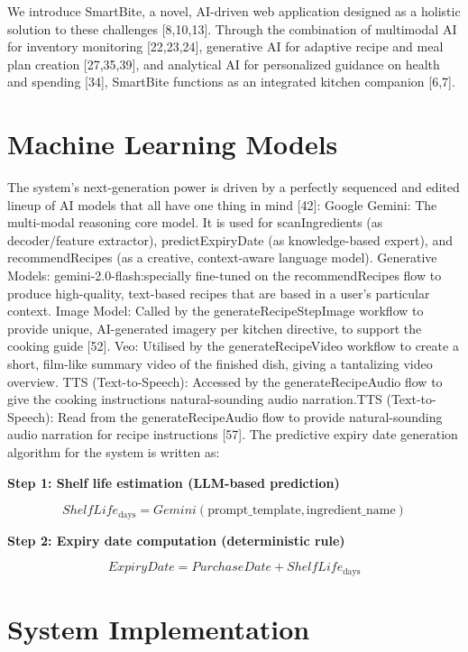 \documentclass[conference]{IEEEtran}
\newcommand{\bluecite}[1]{\textcolor{citation-blue}{[#1]}}
\begin{document}
We introduce SmartBite, a novel, AI-driven web application designed as a holistic solution to these challenges \bluecite{8,10,13}. Through the combination of multimodal AI for inventory monitoring \bluecite{22,23,24}, generative AI for adaptive recipe and meal plan creation \bluecite{27,35,39}, and analytical AI for personalized guidance on health and spending \bluecite{34}, SmartBite functions as an integrated kitchen companion \bluecite{6,7}.

\section{Machine Learning Models}

The system's next-generation power is driven by a perfectly sequenced and edited lineup of AI models that all have one thing in mind \bluecite{42}:
Google Gemini: The multi-modal reasoning core model. It is used for scanIngredients (as decoder/feature extractor), predictExpiryDate (as knowledge-based expert), and recommendRecipes (as a creative, context-aware language model).
Generative Models:
gemini-2.0-flash:specially fine-tuned on the recommendRecipes flow to produce high-quality, text-based recipes that are based in a user's particular context.
Image Model: Called by the generateRecipeStepImage workflow to provide unique, AI-generated imagery per kitchen directive, to support the cooking guide \bluecite{52}.
Veo: Utilised by the generateRecipeVideo workflow to create a short, film-like summary video of the finished dish, giving a tantalizing video overview.
TTS (Text-to-Speech): Accessed by the generateRecipeAudio flow to give the cooking instructions natural-sounding audio narration.TTS (Text-to-Speech): Read from the generateRecipeAudio flow to provide natural-sounding audio narration for recipe instructions \bluecite{57}.
The predictive expiry date generation algorithm for the system is written as:


\textbf{Step 1: Shelf life estimation (LLM-based prediction)}

\[
ShelfLife_{\text{days}} = Gemini(\text{prompt\_template}, \text{ingredient\_name})
\]

\textbf{Step 2: Expiry date computation (deterministic rule)}

\[
ExpiryDate = PurchaseDate + ShelfLife_{\text{days}}
\]

\section{System Implementation}
\end{document}
